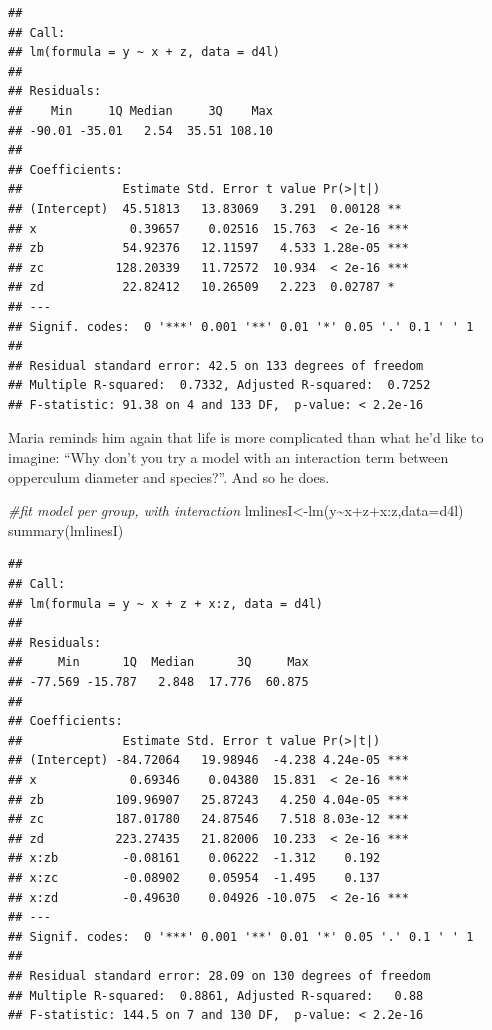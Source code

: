 \documentclass[
]{book}
\newenvironment{Shaded}{\begin{snugshade}}{\end{snugshade}}
\newcommand{\AttributeTok}[1]{\textcolor[rgb]{0.77,0.63,0.00}{#1}}
\newcommand{\CommentTok}[1]{\textcolor[rgb]{0.56,0.35,0.01}{\textit{#1}}}
\newcommand{\FunctionTok}[1]{\textcolor[rgb]{0.00,0.00,0.00}{#1}}
\newcommand{\NormalTok}[1]{#1}
\newcommand{\OtherTok}[1]{\textcolor[rgb]{0.56,0.35,0.01}{#1}}
\newcommand{\SpecialCharTok}[1]{\textcolor[rgb]{0.00,0.00,0.00}{#1}}
\begin{document}
\begin{verbatim}
## 
## Call:
## lm(formula = y ~ x + z, data = d4l)
## 
## Residuals:
##    Min     1Q Median     3Q    Max 
## -90.01 -35.01   2.54  35.51 108.10 
## 
## Coefficients:
##              Estimate Std. Error t value Pr(>|t|)    
## (Intercept)  45.51813   13.83069   3.291  0.00128 ** 
## x             0.39657    0.02516  15.763  < 2e-16 ***
## zb           54.92376   12.11597   4.533 1.28e-05 ***
## zc          128.20339   11.72572  10.934  < 2e-16 ***
## zd           22.82412   10.26509   2.223  0.02787 *  
## ---
## Signif. codes:  0 '***' 0.001 '**' 0.01 '*' 0.05 '.' 0.1 ' ' 1
## 
## Residual standard error: 42.5 on 133 degrees of freedom
## Multiple R-squared:  0.7332, Adjusted R-squared:  0.7252 
## F-statistic: 91.38 on 4 and 133 DF,  p-value: < 2.2e-16
\end{verbatim}

Maria reminds him again that life is more complicated than what he'd like to imagine: ``Why don't you try a model with an interaction term between opperculum diameter and species?''. And so he does.

\begin{Shaded}
\begin{Highlighting}[]
\CommentTok{\#fit model per group, with interaction}
\NormalTok{lmlinesI}\OtherTok{\textless{}{-}}\FunctionTok{lm}\NormalTok{(y}\SpecialCharTok{\textasciitilde{}}\NormalTok{x}\SpecialCharTok{+}\NormalTok{z}\SpecialCharTok{+}\NormalTok{x}\SpecialCharTok{:}\NormalTok{z,}\AttributeTok{data=}\NormalTok{d4l)}
\FunctionTok{summary}\NormalTok{(lmlinesI)}
\end{Highlighting}
\end{Shaded}

\begin{verbatim}
## 
## Call:
## lm(formula = y ~ x + z + x:z, data = d4l)
## 
## Residuals:
##     Min      1Q  Median      3Q     Max 
## -77.569 -15.787   2.848  17.776  60.875 
## 
## Coefficients:
##              Estimate Std. Error t value Pr(>|t|)    
## (Intercept) -84.72064   19.98946  -4.238 4.24e-05 ***
## x             0.69346    0.04380  15.831  < 2e-16 ***
## zb          109.96907   25.87243   4.250 4.04e-05 ***
## zc          187.01780   24.87546   7.518 8.03e-12 ***
## zd          223.27435   21.82006  10.233  < 2e-16 ***
## x:zb         -0.08161    0.06222  -1.312    0.192    
## x:zc         -0.08902    0.05954  -1.495    0.137    
## x:zd         -0.49630    0.04926 -10.075  < 2e-16 ***
## ---
## Signif. codes:  0 '***' 0.001 '**' 0.01 '*' 0.05 '.' 0.1 ' ' 1
## 
## Residual standard error: 28.09 on 130 degrees of freedom
## Multiple R-squared:  0.8861, Adjusted R-squared:   0.88 
## F-statistic: 144.5 on 7 and 130 DF,  p-value: < 2.2e-16
\end{verbatim}
\end{document}
